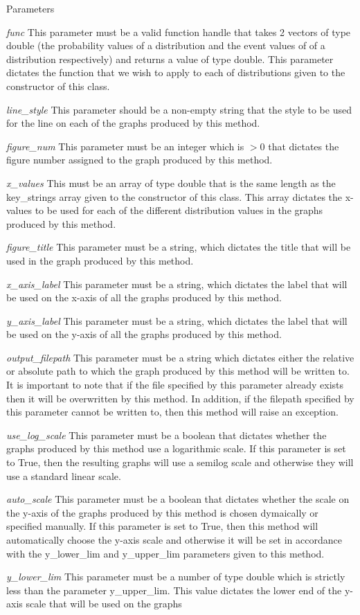 \begin{DoxyParams}{Parameters}
\item[{\em func}]This parameter must be a valid function handle that takes 2 vectors of type double (the probability values of a distribution and the event values of of a distribution respectively) and returns a value of type double. This parameter dictates the function that we wish to apply to each of distributions given to the constructor of this class. \item[{\em line\_\-style}]This parameter should be a non-\/empty string that the style to be used for the line on each of the graphs produced by this method. \item[{\em figure\_\-num}]This parameter must be an integer which is $>$0 that dictates the figure number assigned to the graph produced by this method. \item[{\em x\_\-values}]This must be an array of type double that is the same length as the key\_\-strings array given to the constructor of this class. This array dictates the x-\/values to be used for each of the different distribution values in the graphs produced by this method. \item[{\em figure\_\-title}]This parameter must be a string, which dictates the title that will be used in the graph produced by this method. \item[{\em x\_\-axis\_\-label}]This parameter must be a string, which dictates the label that will be used on the x-\/axis of all the graphs produced by this method. \item[{\em y\_\-axis\_\-label}]This parameter must be a string, which dictates the label that will be used on the y-\/axis of all the graphs produced by this method. \item[{\em output\_\-filepath}]This parameter must be a string which dictates either the relative or absolute path to which the graph produced by this method will be written to. It is important to note that if the file specified by this parameter already exists then it will be overwritten by this method. In addition, if the filepath specified by this parameter cannot be written to, then this method will raise an exception. \item[{\em use\_\-log\_\-scale}]This parameter must be a boolean that dictates whether the graphs produced by this method use a logarithmic scale. If this parameter is set to True, then the resulting graphs will use a semilog scale and otherwise they will use a standard linear scale. \item[{\em auto\_\-scale}]This parameter must be a boolean that dictates whether the scale on the y-\/axis of the graphs produced by this method is chosen dymaically or specified manually. If this parameter is set to True, then this method will automatically choose the y-\/axis scale and otherwise it will be set in accordance with the y\_\-lower\_\-lim and y\_\-upper\_\-lim parameters given to this method. \item[{\em y\_\-lower\_\-lim}]This parameter must be a number of type double which is strictly less than the parameter y\_\-upper\_\-lim. This value dictates the lower end of the y-\/axis scale that will be used on the graphs 
\end{DoxyParams}
